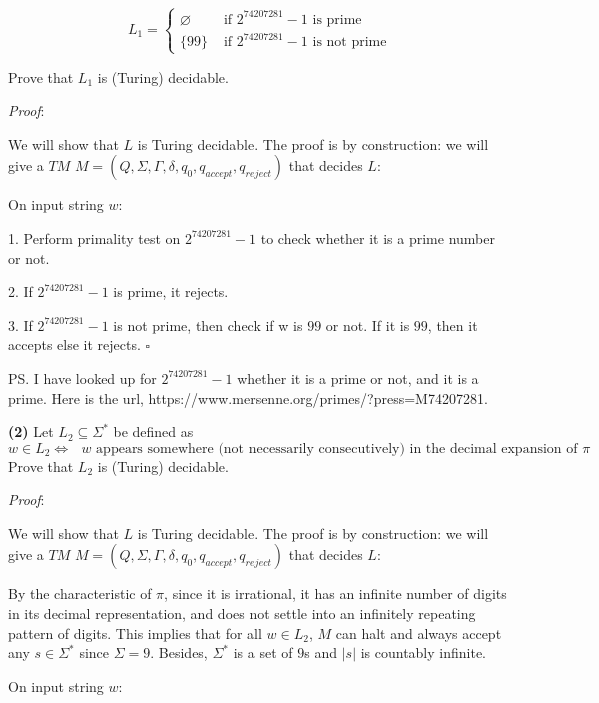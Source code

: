 \documentclass[a4paper, 11pt]{article}
\renewcommand{\part}[1] {\vspace{.10in} {\bf (#1)}}
\begin{document}
	$$
	L_1 = \begin{cases} 
	\varnothing & \text{ if $2^{74207281}-1$ is prime} \\
	\{99\} & \text{ if $2^{74207281}-1$ is not prime}
	\end{cases}
	$$
	
	Prove that $L_1$ is (Turing) decidable.
	
	{\em Proof}:  %
	
	We will show that $L$ is Turing decidable. The proof is by construction: we will give a $TM$ $M = (Q, \Sigma, \Gamma, \delta, q_0 , q_{accept} , q_{reject})$ that decides $L$:
	
	On input string $w$:
	
	1. Perform primality test on $2^{74207281}-1$ to check whether it is a prime number or not.
	
	2. If $2^{74207281}-1$ is prime, it rejects.
	
	3. If $2^{74207281}-1$ is not prime, then check if w is $99$ or not. If it is $99$, then it accepts else it rejects. $\square$
	
	PS. 	
	I have looked up for $2^{74207281}-1$ whether it is a prime or not, and it is a prime. Here is the url, https://www.mersenne.org/primes/?press=M74207281.
	
	\part{2} Let $L_2 \subseteq \Sigma^*$ be defined as
	$$
 	w \in L_2 \iff \text{ $w$ appears somewhere (not necessarily consecutively) in the decimal expansion of $\pi$}
	$$
	Prove that $L_2$ is (Turing) decidable.
	
	
	{\em Proof}: %
	
	We will show that $L$ is Turing decidable. The proof is by construction: we will give a $TM$ $M = (Q, \Sigma, \Gamma, \delta, q_0 , q_{accept} , q_{reject})$ that decides $L$:
	
	By the characteristic of $\pi$, since it is irrational, it has an infinite number of digits in its decimal representation, and does not settle into an infinitely repeating pattern of digits. This implies that for all $w \in L_2$, $M$ can halt and always accept any $s \in \Sigma^*$ since $\Sigma = {9}$. Besides, $\Sigma^*$ is a set of $9$s and $|s|$ is countably infinite.
	
	On input string $w$:
	
\end{document}
